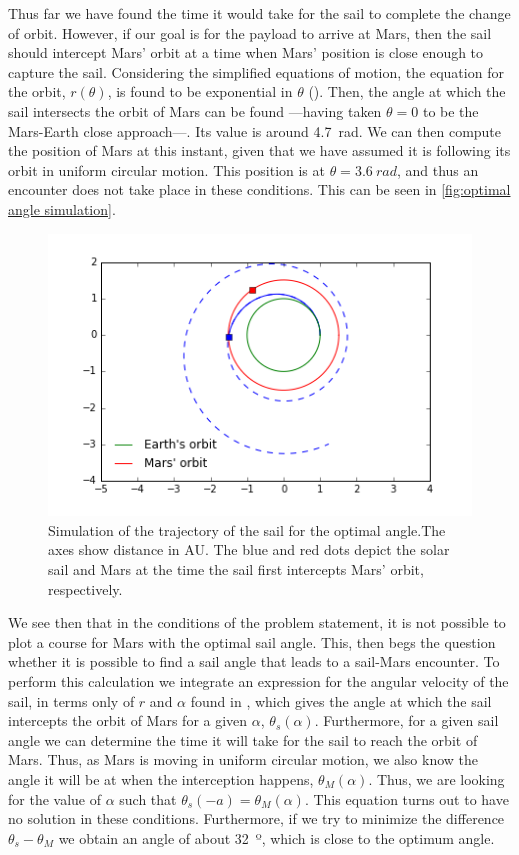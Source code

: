\documentclass[twocolumn,12pt,a4paper]{article}
\numberwithin{equation}{section}
\begin{document}
Thus far we have found the time it would take for the sail to complete the change of orbit. However, if our goal is for the payload to arrive at Mars, then the sail should intercept Mars' orbit at a time when Mars' position is close enough to capture the sail. Considering the simplified equations of motion, the equation for the orbit, \( r(\theta) \), is found to be exponential in \( \theta \) (\cite[p. 155]{mcinnes}). Then, the angle at which the sail intersects the orbit of Mars can be found ---having taken \( \theta = 0	\) to be the Mars-Earth close approach---. Its value is around \SI{4.7}{rad}. We can then compute the position of Mars at this instant, given that we have assumed it is following its orbit in uniform circular motion. This position is at \( \theta = \SI{3.6}{rad} \), and thus an encounter does not take place in these conditions. This can be seen in \autoref{fig:optimal angle simulation}.

\begin{figure}
	\centering
	\includegraphics[scale=0.5]{simu.png}
	\caption{Simulation of the trajectory of the sail for the optimal angle.The axes show distance in AU. The blue and red dots depict the solar sail and Mars at the time the sail first intercepts Mars' orbit, respectively.}
	\label{fig:optimal angle simulation}
\end{figure}

We see then that in the conditions of the problem statement, it is not possible to plot a course for Mars with the optimal sail angle. This, then begs the question whether it is possible to find a sail angle that leads to a sail-Mars encounter. To perform this calculation we integrate an expression for the angular velocity of the sail, in terms only of \( r \) and \( \alpha \) found in \cite[p. 156]{mcinnes}, which gives the angle at which the sail intercepts the orbit of Mars for a given \( \alpha \), \( \theta_s(\alpha) \). Furthermore, for a given sail angle we can determine the time it will take for the sail to reach the orbit of Mars. Thus, as Mars is moving in uniform circular motion, we also know the angle it will be at when the interception happens, \( \theta_M(\alpha) \). Thus, we are looking for the value of \( \alpha \) such that \( \theta_s(-a) = \theta_M(\alpha) \). This equation turns out to have no solution in these conditions. Furthermore, if we try to minimize the difference \( \theta_s - \theta_M \) we obtain an angle of about \SI{32}{º}, which is close to the optimum angle.
\end{document}
